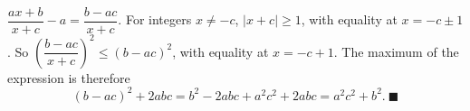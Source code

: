 $\dfrac{ax+b}{x+c}-a=\dfrac{b-ac}{x+c}$. For integers $x\ne-c$, $|x+c|\ge1$, with equality at $x=-c\pm1$. So $\left(\dfrac{b-ac}{x+c}\right)^2\le(b-ac)^2$, with equality at $x=-c+1$. The maximum of the expression is therefore
\[(b-ac)^2+2abc=b^2-2abc+a^2c^2+2abc=a^2c^2+b^2.\ \blacksquare\]
